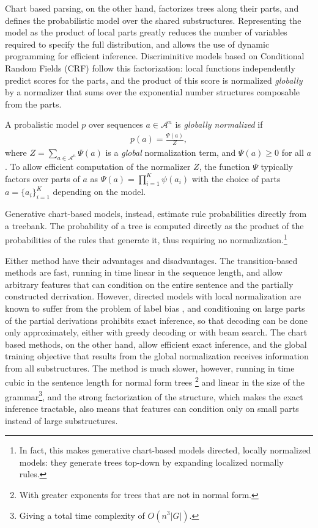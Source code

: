     Chart based parsing, on the other hand, factorizes trees along their parts, and defines the probabilistic model over the shared substructures. Representing the model as the product of local parts greatly reduces the number of variables required to specify the full distribution, and allows the use of dynamic programming for efficient inference. Discriminitive models based on Conditional Random Fields (CRF) \citep{lafferty2001crf} follow this factorization: local functions independently predict scores for the parts, and the product of this score is normalized \textit{globally} by a normalizer that sums over the exponential number structures composable from the parts.
    \begin{definition}{}
      A probalistic model $p$ over sequences $a \in \mathcal{A}^n$ is \textit{globally normalized} if
      \begin{align*}
        p(a) = \frac{ \Psi( a ) }{ Z },
      \end{align*}
      where $Z  = \sum_{a \in \mathcal{A}^n} \Psi( a )$ is a \textit{global} normalization term, and $\Psi( a ) \geq 0$ for all $a$. To allow efficient computation of the normalizer $Z$, the function $\Psi$ typically factors over parts of $a$ as $\Psi ( a ) = \prod_{i=1}^K \psi (a_i )$ with the choice of parts $a = \{a_i\}_{i=1}^K$ depending on the model.
    \end{definition}
    Generative chart-based models, instead, estimate rule probabilities directly from a treebank. The probability of a tree is computed directly as the product of the probabilities of the rules that generate it, thus requiring no normalization.\footnote{In fact, this makes generative chart-based models directed, locally normalized models: they generate trees top-down by expanding localized normally rules.}

    Either method have their advantages and disadvantages. The transition-based methods are fast, running in time linear in the sequence length, and allow arbitrary features that can condition on the entire sentence and the partially constructed derrivation. However, directed models with local normalization are known to suffer from the problem of label bias \citep{lafferty2001crf}, and conditioning on large parts of the partial derivations prohibits exact inference, so that decoding can be done only approximately, either with greedy decoding or with beam search. The chart based methods, on the other hand, allow efficient exact inference, and the global training objective that results from the global normalization  receives information from all substructures. The method is much slower, however, running in time cubic in the sentence length for normal form trees \footnote{With greater exponents for trees that are not in normal form.} and linear in the size of the grammar\footnote{Giving a total time complexity of $O(n^3|G|)$.}, and the strong factorization of the structure, which makes the exact inference tractable, also means that features can condition only on small parts instead of large substructures.

